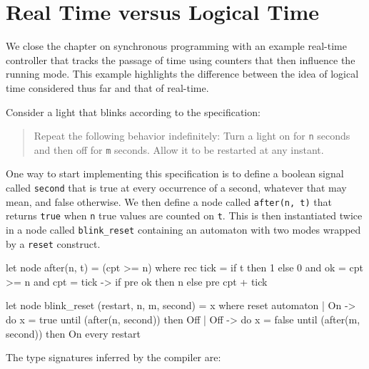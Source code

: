 \documentclass[11pt,titlepage,twoside]{report}
\makeatletter
\newcommand{\zls}[1]{{\@span{class="zelusinline"}#1}}
\newcommand{\zls}[1]{\texttt{#1}}
\renewcommand{\zls}[1]{\texttt{#1}}
\makeatother
\begin{document}
\section{Real Time versus Logical Time\label{realvslogical}} %

We close the chapter on synchronous programming with an example real-time 
controller that tracks the passage of time using counters that then influence 
the running mode.
This example highlights the difference between the idea of logical time 
considered thus far and that of real-time.

Consider a light that blinks according to the specification:
\begin{quote}
Repeat the following behavior indefinitely:
Turn a light on for \texttt{n} seconds and then off for \texttt{m} seconds.
Allow it to be restarted at any instant.
\end{quote}

One way to start implementing this specification is to define a boolean signal 
called \zls{second} that is true at every occurrence of a second, whatever that 
may mean, and false otherwise.
We then define a node called \zls{after(n, t)} that returns \zls{true} when 
\zls{n} true values are counted on \zls{t}.
This is then instantiated twice in a node called \zls{blink\_reset} containing 
an automaton with two modes wrapped by a \zls{reset} construct.
\begin{chklisting}[label=after,label=blink_reset]
let node after(n, t) = (cpt >= n) where
  rec tick = if t then 1 else 0
  and ok = cpt >= n
  and cpt = tick -> if pre ok then n else pre cpt + tick

let node blink_reset (restart, n, m, second) = x where
 reset
   automaton
   | On  -> do x = true  until (after(n, second)) then Off
   | Off -> do x = false until (after(m, second)) then On
 every restart
\end{chklisting}

\medskip
The type signatures inferred by the compiler are:
\chklistingmsg{}
\end{document}
